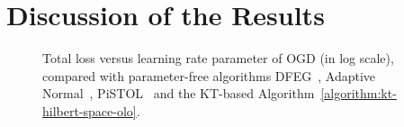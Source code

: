 \section{Discussion of the Results}
\label{section:discussion}

\begin{figure}[t]
\centering
{}
\caption{\footnotesize{Total loss versus learning rate parameter of \ac{OGD}
(in log scale), compared with parameter-free algorithms
DFEG~\cite{Orabona-2013}, Adaptive Normal~\cite{McMahan-Orabona-2014},
PiSTOL~\cite{Orabona-2014} and the KT-based
Algorithm~\ref{algorithm:kt-hilbert-space-olo}.}}
\label{fig:exp_olo}
\end{figure}

